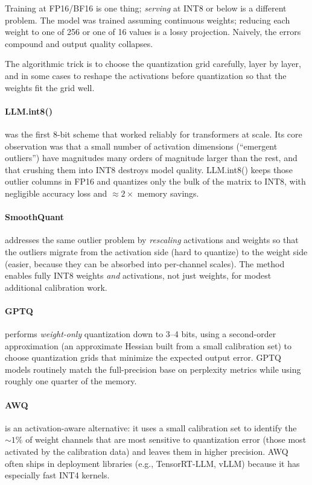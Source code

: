 Training at FP16/BF16 is one thing; \emph{serving} at INT8 or below
is a different problem. The model was trained assuming continuous
weights; reducing each weight to one of 256 or one of 16 values is a
lossy projection. Naively, the errors compound and output quality
collapses.

The algorithmic trick is to choose the quantization grid carefully,
layer by layer, and in some cases to reshape the activations before
quantization so that the weights fit the grid well.

\paragraph{LLM.int8()} \citep{dettmers2022llmint8} was the first
8-bit scheme that worked reliably for transformers at scale. Its
core observation was that a small number of activation dimensions
(``emergent outliers'') have magnitudes many orders of magnitude
larger than the rest, and that crushing them into INT8 destroys
model quality. LLM.int8() keeps those outlier columns in FP16 and
quantizes only the bulk of the matrix to INT8, with negligible
accuracy loss and $\approx 2\times$ memory savings.

\paragraph{SmoothQuant} \citep{xiao2023smoothquant} addresses the
same outlier problem by \emph{rescaling} activations and weights so
that the outliers migrate from the activation side (hard to
quantize) to the weight side (easier, because they can be absorbed
into per-channel scales). The method enables fully INT8 weights
\emph{and} activations, not just weights, for modest additional
calibration work.

\paragraph{GPTQ} \citep{frantar2023gptq} performs \emph{weight-only}
quantization down to 3--4 bits, using a second-order approximation
(an approximate Hessian built from a small calibration set) to
choose quantization grids that minimize the expected output error.
GPTQ models routinely match the full-precision base on perplexity
metrics while using roughly one quarter of the memory.

\paragraph{AWQ} \citep{lin2024awq} is an activation-aware
alternative: it uses a small calibration set to identify the
$\sim 1\%$ of weight channels that are most sensitive to
quantization error (those most activated by the calibration data)
and leaves them in higher precision. AWQ often ships in deployment
libraries (e.g., TensorRT-LLM, vLLM) because it has especially fast
INT4 kernels.

